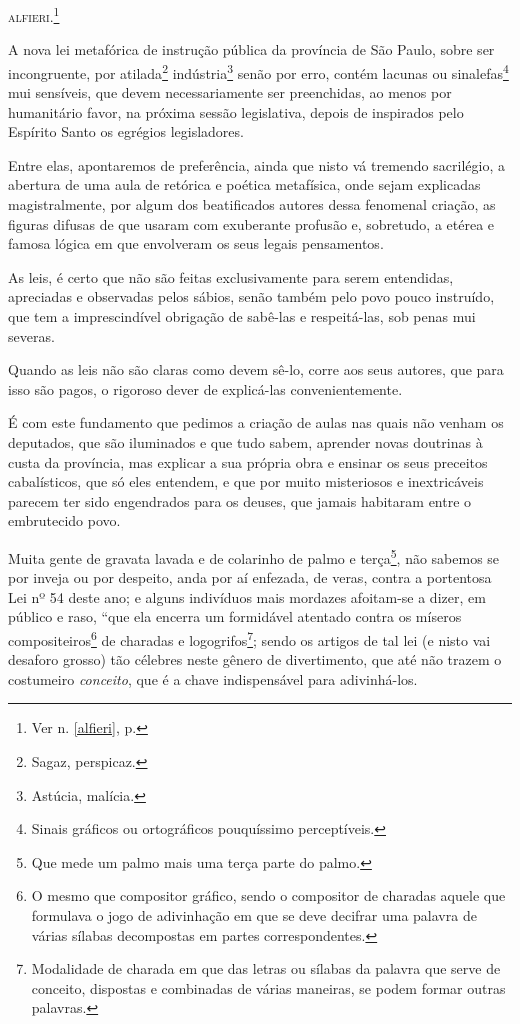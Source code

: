 \textsc{alfieri}.\footnote{Ver n. \ref{alfieri}, p. \pageref{alfieri}}

A nova lei metafórica de instrução pública da província de São Paulo,
sobre ser incongruente, por atilada\footnote{Sagaz, perspicaz.}
indústria\footnote{Astúcia, malícia.} senão por erro, contém lacunas
ou sinalefas\footnote{Sinais gráficos ou ortográficos pouquíssimo
  perceptíveis.} mui sensíveis, que devem necessariamente ser
preenchidas, ao menos por humanitário favor, na próxima sessão
legislativa, depois de inspirados pelo Espírito Santo os egrégios
legisladores.

Entre elas, apontaremos de preferência, ainda que nisto vá tremendo
sacrilégio, a abertura de uma aula de retórica e poética metafísica,
onde sejam explicadas magistralmente, por algum dos beatificados autores
dessa fenomenal criação, as figuras difusas de que usaram com exuberante
profusão e, sobretudo, a etérea e famosa lógica em que envolveram os
seus legais pensamentos.

As leis, é certo que não são feitas exclusivamente para serem
entendidas, apreciadas e observadas pelos sábios, senão também pelo povo
pouco instruído, que tem a imprescindível obrigação de sabê-las e
respeitá-las, sob penas mui severas.

Quando as leis não são claras como devem sê-lo, corre aos seus autores,
que para isso são pagos, o rigoroso dever de explicá-las
convenientemente.

É com este fundamento que pedimos a criação de aulas nas quais não
venham os deputados, que são iluminados e que tudo sabem, aprender novas
doutrinas à custa da província, mas explicar a sua própria obra e
ensinar os seus preceitos cabalísticos, que só eles entendem, e que por
muito misteriosos e inextricáveis parecem ter sido engendrados para os
deuses, que jamais habitaram entre o embrutecido povo.

Muita gente de gravata lavada e de colarinho de palmo e
terça\footnote{Que mede um palmo mais uma terça parte do palmo.}, não
sabemos se por inveja ou por despeito, anda por aí enfezada, de veras,
contra a portentosa Lei nº 54 deste ano; e alguns indivíduos mais
mordazes afoitam-se a dizer, em público e raso, ``que ela encerra um
formidável atentado contra os míseros compositeiros\footnote{O mesmo
  que compositor gráfico, sendo o compositor de charadas aquele que
  formulava o jogo de adivinhação em que se deve decifrar uma palavra de
  várias sílabas decompostas em partes correspondentes.} de charadas e
logogrifos\footnote{Modalidade de charada em que das letras ou sílabas
  da palavra que serve de conceito, dispostas e combinadas de várias
  maneiras, se podem formar outras palavras.}; sendo os artigos de tal
lei (e nisto vai desaforo grosso) tão célebres neste gênero de
divertimento, que até não trazem o costumeiro \emph{conceito}, que é a
chave indispensável para adivinhá-los.

